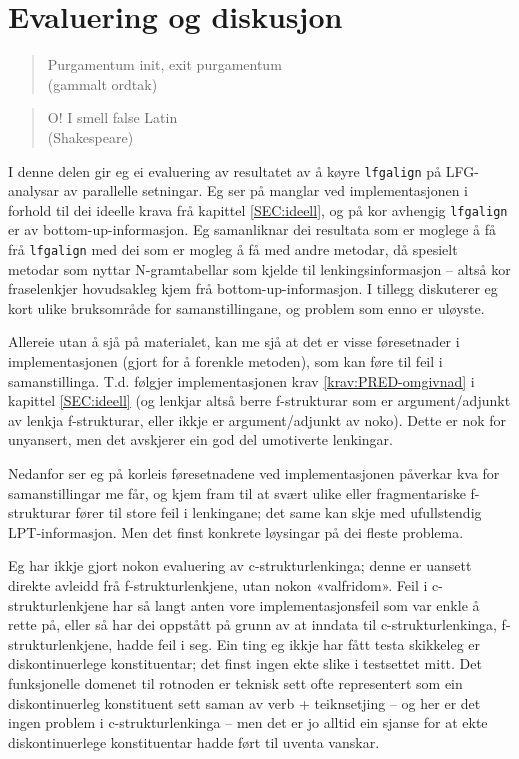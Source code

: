 \documentclass[12pt,a4paper,oneside,draft]{report}
\newcommand{\q}[2]{\begin{quotation}\raggedleft{}#1\\\vspace{0.2cm}(#2)\vspace{1.2cm}\end{quotation}}
\begin{document}
\chapter{Evaluering og diskusjon}
\label{sec-5}

\label{SEC:diskusjon}

  \q{Purgamentum init, exit purgamentum}
  {gammalt ordtak}

  \q{O! I smell false Latin}
  {Shakespeare}
  
  
  

 I denne delen gir eg ei evaluering av resultatet av å køyre
 \texttt{lfgalign} på LFG\hyp{}analysar av parallelle setningar. Eg ser på manglar
 ved implementasjonen i forhold til dei ideelle krava frå kapittel
 \ref{SEC:ideell}, og på kor avhengig \texttt{lfgalign} er av
 bottom-up-informasjon. Eg samanliknar dei resultata som er moglege å
 få frå \texttt{lfgalign} med dei som er mogleg å få med andre metodar, då
 spesielt metodar som nyttar N-gramtabellar som kjelde til
 lenkingsinformasjon -- altså kor fraselenkjer hovudsakleg kjem frå
 bottom-up-informasjon. I tillegg diskuterer eg kort ulike bruksområde
 for samanstillingane, og problem som enno er uløyste.

 Allereie utan å sjå på materialet, kan me sjå at det er visse
 føresetnader i implementasjonen (gjort for å forenkle metoden), som
 kan føre til feil i samanstillinga. T.d. følgjer implementasjonen
 krav \ref{krav:PRED-omgivnad} i kapittel \ref{SEC:ideell} (og lenkjar
 altså berre f\hyp{}strukturar som er argument/adjunkt av lenkja
 f\hyp{}strukturar, eller ikkje er argument/adjunkt av noko). Dette er nok
 for unyansert, men det avskjerer ein god del umotiverte lenkingar.

 Nedanfor ser eg på korleis føresetnadene ved implementasjonen
 påverkar kva for samanstillingar me får, og kjem fram til at svært
 ulike eller fragmentariske f\hyp{}strukturar fører til store feil i
 lenkingane; det same kan skje med ufullstendig
 LPT\hyp{}informasjon. Men det finst konkrete løysingar på dei fleste
 problema.

 Eg har ikkje gjort nokon evaluering av c\hyp{}strukturlenkinga; denne
 er uansett direkte avleidd frå f\hyp{}strukturlenkjene, utan nokon
 «valfridom». Feil i c\hyp{}strukturlenkjene har så langt anten vore
 implementasjonsfeil som var enkle å rette på, eller så har dei
 oppstått på grunn av at inndata til c\hyp{}strukturlenkinga,
 f\hyp{}strukturlenkjene, hadde feil i seg. Ein ting eg ikkje har fått
 testa skikkeleg er diskontinuerlege konstituentar; det finst ingen
 ekte slike i testsettet mitt. Det funksjonelle domenet til rotnoden
 er teknisk sett ofte representert som ein diskontinuerleg konstituent
 sett saman av verb + teiknsetjing -- og her er det ingen problem i
 c\hyp{}strukturlenkinga -- men det er jo alltid ein sjanse for at
 ekte diskontinuerlege konstituentar hadde ført til uventa vanskar.
 
\end{document}

